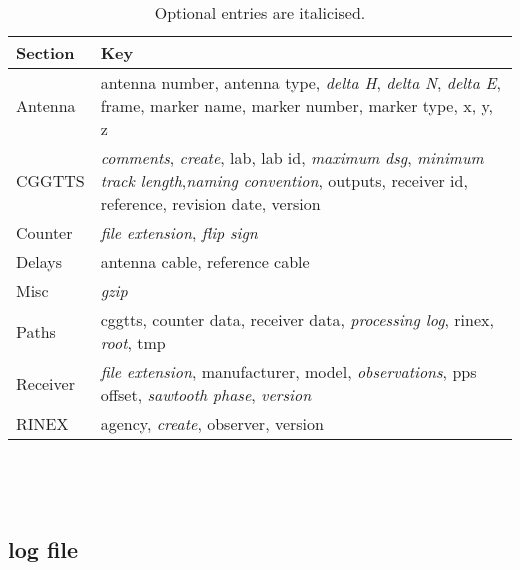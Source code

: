 \begin{table}
\begin{tabular}{l|p{10cm}}
Section & Key \\ \hline
Antenna & antenna number, antenna type, \textit{delta H}, \textit{delta N},
         \textit{delta E}, frame, marker name, marker number, marker type, 
         x, y, z \\ \hline
CGGTTS  & \textit{comments}, \textit{create}, lab, lab id, 
         \textit{maximum dsg}, \textit{minimum track length},\textit{naming convention},
         outputs, receiver id, reference, revision date, version\\
Counter & \textit{file extension}, \textit{flip sign}\\ \hline
Delays  &  antenna cable, reference cable\\
Misc & \textit{gzip}\\
Paths & cggtts, counter data, receiver data, \textit{processing log},
        rinex, \textit{root}, tmp\\
Receiver & \textit{file extension}, manufacturer, model,
          \textit{observations}, pps offset, \textit{sawtooth phase},
          \textit{version}\\ \hline
RINEX & agency, \textit{create}, observer, version\\
\end{tabular}
\caption{Optional entries are italicised. \label{t:gpscvKeys}}
\end{table}

\begin{lstlisting}




\end{lstlisting}

\subsection{log file}